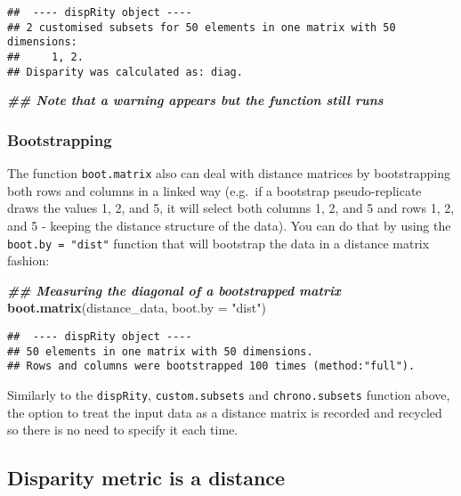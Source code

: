 \documentclass[
]{book}
\newenvironment{Shaded}{\begin{snugshade}}{\end{snugshade}}
\newcommand{\AttributeTok}[1]{\textcolor[rgb]{0.13,0.29,0.53}{#1}}
\newcommand{\DocumentationTok}[1]{\textcolor[rgb]{0.56,0.35,0.01}{\textbf{\textit{#1}}}}
\newcommand{\FunctionTok}[1]{\textcolor[rgb]{0.13,0.29,0.53}{\textbf{#1}}}
\newcommand{\NormalTok}[1]{#1}
\newcommand{\StringTok}[1]{\textcolor[rgb]{0.31,0.60,0.02}{#1}}
\begin{document}
\begin{verbatim}
##  ---- dispRity object ---- 
## 2 customised subsets for 50 elements in one matrix with 50 dimensions:
##     1, 2.
## Disparity was calculated as: diag.
\end{verbatim}

\begin{Shaded}
\begin{Highlighting}[]
\DocumentationTok{\#\# Note that a warning appears but the function still runs}
\end{Highlighting}
\end{Shaded}

\hypertarget{bootstrapping}{%
\subsubsection{Bootstrapping}\label{bootstrapping}}

The function \texttt{boot.matrix} also can deal with distance matrices by bootstrapping both rows and columns in a linked way (e.g.~if a bootstrap pseudo-replicate draws the values 1, 2, and 5, it will select both columns 1, 2, and 5 and rows 1, 2, and 5 - keeping the distance structure of the data).
You can do that by using the \texttt{boot.by\ =\ "dist"} function that will bootstrap the data in a distance matrix fashion:

\begin{Shaded}
\begin{Highlighting}[]
\DocumentationTok{\#\# Measuring the diagonal of a bootstrapped matrix}
\FunctionTok{boot.matrix}\NormalTok{(distance\_data, }\AttributeTok{boot.by =} \StringTok{"dist"}\NormalTok{)}
\end{Highlighting}
\end{Shaded}

\begin{verbatim}
##  ---- dispRity object ---- 
## 50 elements in one matrix with 50 dimensions.
## Rows and columns were bootstrapped 100 times (method:"full").
\end{verbatim}

Similarly to the \texttt{dispRity}, \texttt{custom.subsets} and \texttt{chrono.subsets} function above, the option to treat the input data as a distance matrix is recorded and recycled so there is no need to specify it each time.

\hypertarget{disparity-metric-is-a-distance}{%
\subsection{Disparity metric is a distance}\label{disparity-metric-is-a-distance}}
\end{document}

